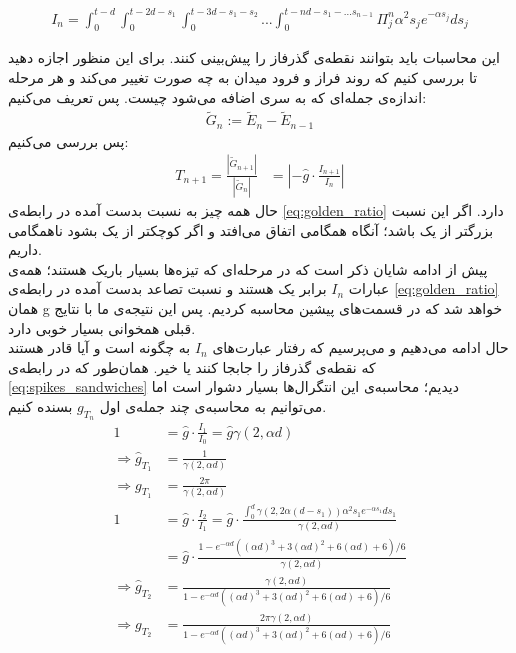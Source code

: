 \begin{align}
	I_n = \int_{0}^{t - d} \int_{0}^{t - 2d - s_1} \int_{0}^{t - 3d - s_1 - s_2} ... \int_{0}^{t - nd - s_1 - ... s_{n-1}} \Pi^n_j \alpha^2 s_j e^{-\alpha s_j} ds_j
	\label{eq:spikes_sandwiches}
\end{align}

این محاسبات باید بتوانند نقطه‌ی گذرفاز را پیش‌بینی کنند. برای این منظور اجازه دهید تا بررسی کنیم که روند فراز و فرود میدان به چه صورت تغییر می‌کند و هر مرحله اندازه‌ی جمله‌ای که به سری اضافه می‌شود چیست. پس تعریف می‌کنیم:
\begin{align}
	\tilde{G}_{n} := \tilde{E}_{n} - \tilde{E}_{n-1}
\end{align}
پس بررسی می‌کنیم:
\begin{align}
	T_{n+1} = \frac{|\tilde{G}_{n+1}|}{|\tilde{G}_{n}|} &= |-\hat{g} \cdot \frac{I_{n+1}}{I_n}|
	\label{eq:golden_ratio}
\end{align}
حال همه چیز به نسبت بدست آمده در رابطه‌ی
\ref{eq:golden_ratio}
دارد. اگر این نسبت بزرگتر از یک باشد؛ آنگاه همگامی اتفاق می‌افتد و اگر کوچکتر از یک بشود ناهمگامی داریم.\\
پیش از ادامه شایان ذکر است که در مرحله‌ای که تیزه‌ها بسیار باریک هستند؛ همه‌ی عبارات 
$I_n$
برابر یک هستند و نسبت تصاعد بدست آمده در رابطه‌ی 
\ref{eq:golden_ratio}
همان g خواهد شد که در قسمت‌های پیشین محاسبه کردیم. پس این نتیجه‌ی ما با نتایج قبلی همخوانی بسیار خوبی دارد.\\

حال ادامه می‌دهیم و می‌پرسیم که رفتار عبارت‌های 
$I_n$
به چگونه است و آیا قادر هستند که نقطه‌ی گذرفاز را جابجا کنند یا خیر. همان‌طور که در رابطه‌ی 
\ref{eq:spikes_sandwiches}
دیدیم؛ محاسبه‌ی این انتگرال‌ها بسیار دشوار است اما می‌توانیم به محاسبه‌ی چند جمله‌ی اول 
$g_{T_n}$
بسنده کنیم.
\begin{align}
	1 &= \hat{g} \cdot \frac{I_1}{I_0} = \hat{g} \gamma(2,\alpha d)\\
	\Rightarrow \hat{g}_{T_1} &= \frac{1}{\gamma(2,\alpha d)}\\
	\Rightarrow g_{T_1} &= \frac{2\pi}{\gamma(2,\alpha d)}\\
	1 &= \hat{g} \cdot \frac{I_2}{I_1} = \hat{g} \cdot \frac{\int_0^{d} \gamma(2,2\alpha (d-s_1)) \alpha^2 s_1 e^{-\alpha s_1} ds_1 }{\gamma(2,\alpha d)}\\
	&= \hat{g} \cdot \frac{1 - e^{- \alpha d}( (\alpha d)^3 + 3(\alpha d)^2 + 6(\alpha d) + 6)/6}{\gamma(2,\alpha d)}\\
	\Rightarrow \hat{g}_{T_2} &= \frac{\gamma(2,\alpha d)}{1 - e^{- \alpha d}( (\alpha d)^3 + 3(\alpha d)^2 + 6(\alpha d) + 6)/6}\\
	\Rightarrow g_{T_2} &= \frac{2\pi \gamma(2,\alpha d)}{1 - e^{- \alpha d}( (\alpha d)^3 + 3(\alpha d)^2 + 6(\alpha d) + 6)/6}
\end{align}

